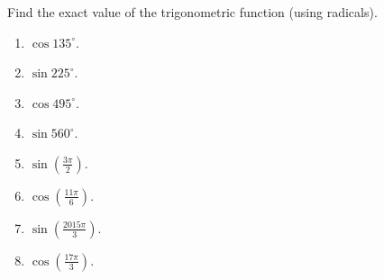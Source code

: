 Find the exact value of the trigonometric function (using radicals).

\begin{enumerate}[ref={\fcProblemRef}]
\item $\cos 135^\circ$.

\answer{$ $}
\item $\sin 225^\circ$.

\answer{$ $}
\item $\cos 495^\circ$.

\answer{$ $}
\item $\sin 560^\circ$.

\answer{$ $}
\item $\displaystyle \sin \left(\frac{ 3\pi}{2}\right)$.

\answer{$ $}
\item $\displaystyle \cos \left(\frac{ 11\pi}{6}\right)$.

\answer{$ $}
\item $\displaystyle \sin \left(\frac{ 2015\pi}{3}\right)$.

\answer{$ $}
\item $\displaystyle \cos \left(\frac{ 17\pi}{3}\right)$.

\answer{$ $}
\end{enumerate}